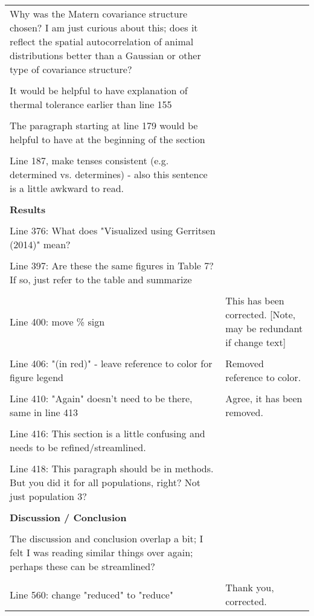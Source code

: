 \documentclass{article}
\begin{document}
\begin{landscape}
\begin{center}
\begin{longtable}{p{12cm} | p{12cm}}
\\
Why was the Matern covariance structure chosen? I am just curious about this;
does it reflect the spatial autocorrelation of animal distributions better than
a Gaussian or other type of covariance structure? & \\
\\
It would be helpful to have explanation of thermal tolerance earlier than line
155 & \\
\\
The paragraph starting at line 179 would be helpful to have at the beginning of
the section & \\
\\
Line 187, make tenses consistent (e.g. determined vs. determines) - also this
sentence is a little awkward to read. & \\
\\
		\hline
		\textbf{Results} &  \\
\\
Line 376: What does "Visualized using Gerritsen (2014)" mean? & \\
\\
Line 397: Are these the same figures in Table 7? If so, just refer to the table
and summarize & \\
\\
Line 400: move \% sign & This has been corrected. [Note, may be redundant if
change text] \\
\\
Line 406: "(in red)" - leave reference to color for figure legend & Removed
reference to color. \\
\\
Line 410: "Again" doesn't need to be there, same in line 413 & Agree, it has
been removed. \\
\\
Line 416: This section is a little confusing and needs to be refined/streamlined. & \\
\\
Line 418: This paragraph should be in methods. But you did it for all
populations, right? Not just population 3? & \\
\\
		\hline
		\textbf{Discussion / Conclusion} &  \\
\\
The discussion and conclusion overlap a bit; I felt I was reading similar
things over again; perhaps these can be streamlined? & \\
\\
Line 560: change "reduced" to "reduce" & Thank you, corrected. \\

\end{longtable}
\end{center}
\end{landscape}
\end{document}
